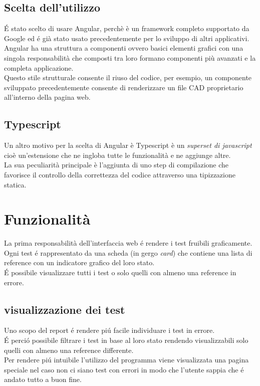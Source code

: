         \subsection{Scelta dell'utilizzo}
            \'E stato scelto di usare Angular, perchè è un framework completo supportato da Google
            ed \'e già stato usato precedentemente per lo sviluppo di altri applicativi.\\
            
            Angular ha una struttura a componenti ovvero basici elementi grafici con una singola responsabilità che composti tra loro formano componenti più avanzati e la completa applicazione.\\
            Questo stile strutturale consente il riuso del codice, per esempio, un componente sviluppato precedentemente consente
            di renderizzare un file CAD proprietario all'interno della pagina web.
        
        \subsection{Typescript}
            Un altro motivo per la scelta di Angular è \cite{Typescript}
            Typescript è un \textit{superset di javascript} cioè un'estensione che ne ingloba tutte le funzionalità e ne aggiunge altre.\\
            La sua peculiarità principale è l'aggiunta di uno step di compilazione che favorisce il controllo della correttezza del codice attraverso una tipizzazione statica.
    \section{Funzionalità}
        La prima responsabilità dell'interfaccia web \'e rendere i test fruibili graficamente.\\
        Ogni test \'e rappresentato da una scheda (in gergo \textit{card}) che contiene una lista di reference con un indicatore grafico del loro stato.\\
        \'E possibile visualizzare tutti i test o solo quelli con almeno una reference in errore.\\
        \subsection{visualizzazione dei test}        
            Uno scopo del report \'e rendere pi\'u facile individuare i test in errore.\\
            \'E perci\'o possibile filtrare i test in base al loro stato rendendo visualizzabili solo quelli con almeno una reference differente.\\
            Per rendere pi\'u intuibile l'utilizzo del programma viene visualizzata una pagina speciale nel caso non ci siano test con errori in modo che l'utente sappia che \'e andato tutto a buon fine.

